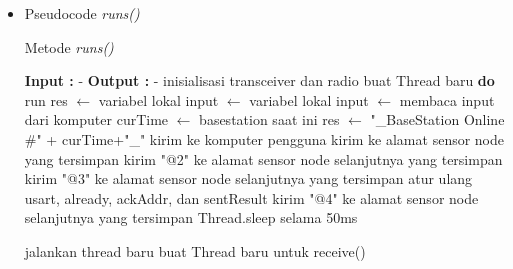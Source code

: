 \begin{itemize}
	\item Pseudocode {\it runs()}
	\begin{algorithm}[htbp]
		\caption{Metode {\it runs()}}
		\begin{algorithmic}[1]
		\State \textbf{Input  :} -
		\State \textbf{Output :} -
			\try
				\State inisialisasi transceiver dan radio
				\State buat Thread baru \textbf{do}
					\Function run
							\State res $\leftarrow$ variabel lokal
							\State input $\leftarrow$ variabel lokal
							\try 
							\State input $\leftarrow$ membaca input dari komputer
								\State curTime $\leftarrow$ basestation saat ini
								\State res $\leftarrow$ "\_BaseStation Online \#" + curTime+"\_"
								\State kirim ke komputer pengguna
								\State kirim ke alamat sensor node yang tersimpan
								\State kirim "@2" ke alamat sensor node selanjutnya yang tersimpan											
								\State kirim "@3" ke alamat sensor node selanjutnya yang tersimpan
								\State atur ulang usart, already, ackAddr, dan sentResult
								\State kirim "@4" ke alamat sensor node selanjutnya yang tersimpan
							\EndIf
							\State Thread.sleep selama 50ms
\end{algorithmic}
\end{algorithm}

\begin{algorithm}[H]
\begin{algorithmic}
						\endtry
						\EndWhile
					\EndFunction
					
				\State jalankan thread baru
				\State buat Thread baru untuk receive()
			\endtry
		\EndFunction
	\end{algorithmic}
	\end{algorithm}
\end{itemize}

